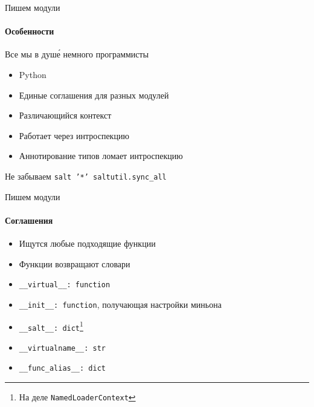 ﻿

\begin{Frame}{Пишем модули}
  \framesubtitle{Особенности}

  \begin{center}
    Все мы в душ\'е немного программисты \inlineicon{\faKeyboard[regular]}
  \end{center}

  \onslide<+->

  \begin{itemize}[<+-| alert@ +>]

    \item[\faPython] Python\vfill
    \item[{\faHandshake[regular]}] Единые соглашения для разных модулей\vfill
    \item[\faHatWizard] Различающийся контекст
    \item[\faMicroscope] Работает через интроспекцию
    \item[\faSkullCrossbones] Аннотирование типов ломает интроспекцию
  \end{itemize}

  \vfill

  \onslide<+->
  \begin{center}
    \inlineicon{\faLightbulb[regular]}
    Не забываем \texttt{salt '*' saltutil.sync\_all}
  \end{center}

\end{Frame}

\begin{frame}{Пишем модули}
  \framesubtitle{Соглашения}

  \ExampleNote{}

  \begin{itemize}[<+-| alert@ +>]
    \item Ищутся любые подходящие функции
    \item Функции возвращают словари
    \item \texttt{\_\_virtual\_\_: function}
    \item \texttt{\_\_init\_\_: function}, получающая настройки миньона
    \item \texttt{\_\_salt\_\_: dict}\footnote{%
      На деле \texttt{NamedLoaderContext} \faGhost}
    \item \texttt{\_\_virtualname\_\_: str}
    \item \texttt{\_\_func\_alias\_\_: dict}
  \end{itemize}
\end{frame}

